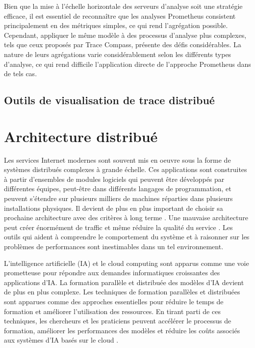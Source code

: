 Bien que la mise à l'échelle horizontale des serveurs d'analyse soit une stratégie efficace, il est essentiel de reconnaître que les analyses Prometheus consistent principalement en des métriques simples, ce qui rend l'agrégation possible. Cependant, appliquer le même modèle à des processus d'analyse plus complexes, tels que ceux proposés par Trace Compass, présente des défis considérables. La nature de leurs agrégations varie considérablement selon les différents types d'analyse, ce qui rend difficile l'application directe de l'approche Prometheus dans de tels cas.

\subsection{Outils de visualisation de trace distribué}


\section{Architecture distribué}

Les services Internet modernes sont souvent mis en oeuvre sous la forme de systèmes distribués complexes à grande échelle. Ces applications sont construites à partir d'ensembles de modules logiciels qui peuvent être développés par différentes équipes, peut-être dans différents langages de programmation, et peuvent s'étendre sur plusieurs milliers de machines réparties dans plusieurs installations physiques. Il devient de plus en plus important de choisir sa prochaine architecture avec des critères à long terme \cite{Martens_2010}. Une mauvaise architecture peut créer énormément de traffic et même réduire la qualité du service \cite{Kolny_2023}. Les outils qui aident à comprendre le comportement du système et à raisonner sur les problèmes de performances sont inestimables dans un tel environnement.

L'intelligence artificielle (IA) et le cloud computing sont apparus comme une voie prometteuse pour répondre aux demandes informatiques croissantes des applications d'IA. La formation parallèle et distribuée des modèles d'IA devient de plus en plus complexe. Les techniques de formation parallèles et distribuées sont apparues comme des approches essentielles pour réduire le temps de formation et améliorer l'utilisation des ressources. En tirant parti de ces techniques, les chercheurs et les praticiens peuvent accélérer le processus de formation, améliorer les performances des modèles et réduire les coûts associés aux systèmes d'IA basés sur le cloud \cite{mungoli2023scalable}.

